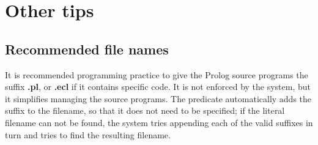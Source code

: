 \section{Other tips}
\subsection{Recommended file names}

It is recommended programming practice to give the Prolog source
programs the suffix {\bf .pl}, or {\bf .ecl} if it contains {\eclipse}
specific code.  It is not enforced by the system, but it simplifies
managing the source programs.  The
 predicate
automatically adds the suffix to the filename, so that it does not
need to be specified; if the literal filename can not be found, the
system tries appending each of the valid suffixes in turn and tries to
find the resulting filename.


